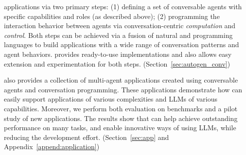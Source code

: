\begin{enumerate}[leftmargin=*]
    applications
    via two primary steps: (1) defining a set of conversable agents with specific capabilities
    and roles (as described above); (2) programming the interaction behavior between agents via conversation-centric \emph{computation} and \emph{control}. %
    Both steps can be achieved via a fusion of natural and programming languages to build applications with a wide range of conversation patterns and agent behaviors. \libName provides ready-to-use implementations and also allows easy extension and experimentation for both steps. 
    (Section~\ref{sec:autogen_conv})
    
\end{enumerate}

\libName also provides a collection of multi-agent applications created using conversable agents and conversation programming.
These applications demonstrate how \libName can easily %
support applications of various complexities and LLMs of various capabilities. 
Moreover, we perform %
both evaluation on benchmarks and a pilot study of new applications. The results show that \libName can help achieve outstanding performance on many tasks, and enable innovative ways of using LLMs, while reducing the development %
effort. (Section~\ref{sec:app} and Appendix~\ref{append:application})  
    

